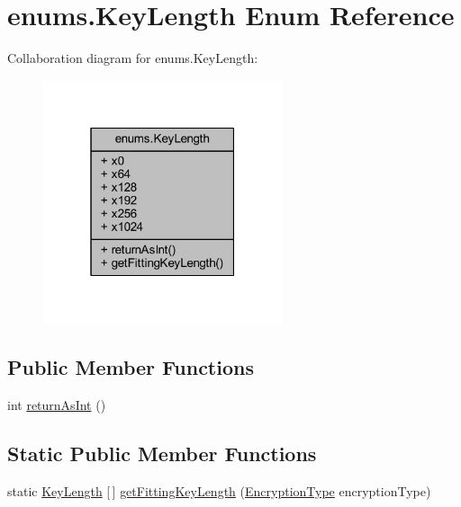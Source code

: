 \hypertarget{enumenums_1_1_key_length}{}\section{enums.\+Key\+Length Enum Reference}
\label{enumenums_1_1_key_length}


Collaboration diagram for enums.\+Key\+Length\+:\nopagebreak
\begin{figure}[H]
\begin{center}
\leavevmode
\includegraphics[width=199pt]{enumenums_1_1_key_length__coll__graph}
\end{center}
\end{figure}
\subsection*{Public Member Functions}
\begin{DoxyCompactItemize}
\item 
int \mbox{\hyperlink{enumenums_1_1_key_length_a0f7b59831fc63110038baa6e444eddb1}{return\+As\+Int}} ()
\end{DoxyCompactItemize}
\subsection*{Static Public Member Functions}
\begin{DoxyCompactItemize}
\item 
static \mbox{\hyperlink{enumenums_1_1_key_length}{Key\+Length}} \mbox{[}$\,$\mbox{]} \mbox{\hyperlink{enumenums_1_1_key_length_afcdc6e370c70b47131b467b708c30f2f}{get\+Fitting\+Key\+Length}} (\mbox{\hyperlink{enumenums_1_1_encryption_type}{Encryption\+Type}} encryption\+Type)
\end{DoxyCompactItemize}
